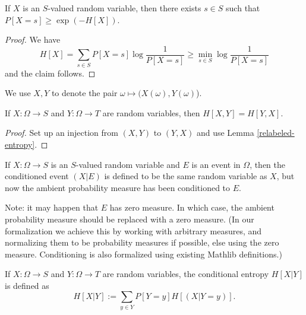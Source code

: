 \begin{lemma}\label{bound-conc}
  If $X$ is an $S$-valued random variable, then there exists $s \in S$ such that $P[X=s] \geq \exp(-H[X])$.
\end{lemma}

\begin{proof}
  We have
  $$ H[X] = \sum_{s \in S} P[X=s] \log \frac{1}{P[X=s]} \geq \min_{s \in S} \log \frac{1}{P[X=s]}$$
  and the claim follows.
\end{proof}

We use $X,Y$ to denote the pair $\omega \mapsto (X(\omega),Y(\omega)$).

\begin{lemma}
  \label{entropy-comm}
  \leanok
  If $X: \Omega \to S$ and $Y: \Omega \to T$ are random variables, then $H[X, Y] = H[Y, X]$.
\end{lemma}
\begin{proof}
  Set up an injection from $(X,Y)$ to $(Y,X)$ and use Lemma \ref{relabeled-entropy}.
\end{proof}


\begin{definition}
  \label{condition-event-def}
  \leanok
  If $X: \Omega \to S$ is an $S$-valued random variable and $E$ is an event in $\Omega$, then the conditioned event $(X|E)$ is defined to be the same random variable as $X$, but now the ambient probability measure has been conditioned to $E$.
\end{definition}

Note: it may happen that $E$ has zero measure.  In which case, the ambient probability measure should be replaced with a zero measure.  (In our formalization we achieve this by working with arbitrary measures, and normalizing them to be probability measures if possible, else using the zero measure.  Conditioning is also formalized using existing Mathlib definitions.)

\begin{definition}
  \label{conditional-entropy-def}
  \leanok
  If $X: \Omega \to S$ and $Y: \Omega \to T$ are random variables, the conditional entropy $H[X|Y]$ is defined as
  $$ H[X|Y] := \sum_{y \in Y} P[Y = y] H[(X | Y=y)].$$
\end{definition}

